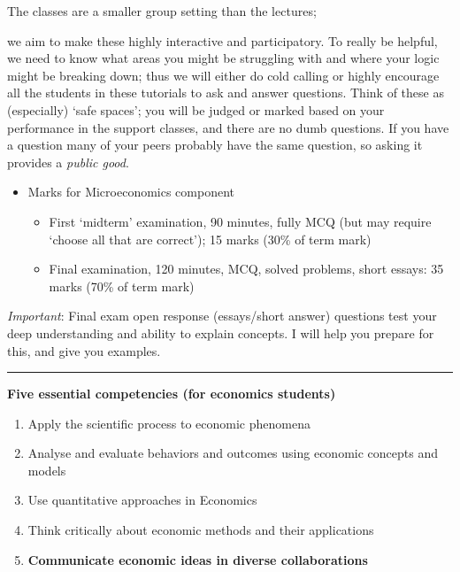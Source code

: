 \documentclass[]{article}
\providecommand{\tightlist}{%
  \setlength{\itemsep}{0pt}\setlength{\parskip}{0pt}}
\begin{document}
The classes are a smaller group setting than the lectures;

we aim to make these highly interactive and participatory. To really be
helpful, we need to know what areas you might be struggling with and
where your logic might be breaking down; thus we will either do cold
calling or highly encourage all the students in these tutorials to ask
and answer questions. Think of these as (especially) `safe spaces'; you
will be judged or marked based on your performance in the support
classes, and there are no dumb questions. If you have a question many of
your peers probably have the same question, so asking it provides a
\emph{public good}.

\begin{itemize}
\tightlist
\item
  Marks for Microeconomics component

  \begin{itemize}
  \tightlist
  \item
    First `midterm' examination, 90 minutes, fully MCQ (but may require
    `choose all that are correct'); 15 marks (30\% of term mark)
  \item
    Final examination, 120 minutes, MCQ, solved problems, short essays:
    35 marks (70\% of term mark)
  \end{itemize}
\end{itemize}

\emph{Important}: Final exam open response (essays/short answer)
questions test your deep understanding and ability to explain concepts.
I will help you prepare for this, and give you examples.

\begin{center}\rule{0.5\linewidth}{\linethickness}\end{center}

\textbf{Five essential competencies (for economics students)}

\begin{enumerate}
\def\labelenumi{\arabic{enumi}.}
\item
  Apply the scientific process to economic phenomena
\item
  Analyse and evaluate behaviors and outcomes using economic concepts
  and models
\item
  Use quantitative approaches in Economics
\item
  Think critically about economic methods and their applications
\item
  \textbf{Communicate economic ideas in diverse collaborations}
\end{enumerate}
\end{document}
